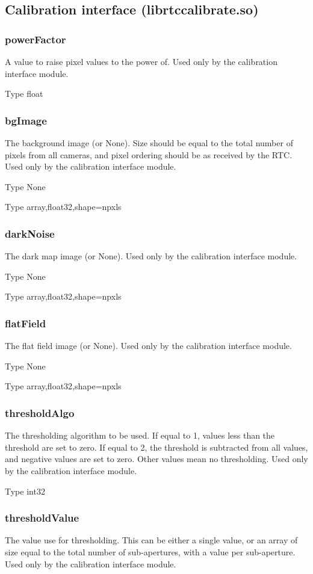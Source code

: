 \documentclass[a4,10pt]{article}
\begin{document}
\subsection{Calibration interface (librtccalibrate.so)}
\subsubsection{powerFactor}
A value to raise pixel values to the power of.  Used only by the
calibration interface module.  

Type float

\subsubsection{bgImage}
The background image (or None).  Size should be equal to the total
number of pixels from all cameras, and pixel ordering should be as
received by the RTC.  Used only by the calibration interface module.

Type None

Type array,float32,shape=npxls

\subsubsection{darkNoise}
The dark map image (or None).  Used only by the calibration interface module.

Type None

Type array,float32,shape=npxls

\subsubsection{flatField}
The flat field image (or None).  Used only by the calibration interface module.

Type None

Type array,float32,shape=npxls

\subsubsection{thresholdAlgo}
The thresholding algorithm to be used.  If equal to 1, 
values less than the threshold are set to zero.  If equal to 2, the
threshold is subtracted from all values, and negative values are set
to zero.  Other values mean no thresholding.  Used only by the calibration interface module.

Type int32

\subsubsection{thresholdValue}
The value use for thresholding.  This can be either a single value, or
an array of size equal to the total number of sub-apertures, with a
value per sub-aperture.  Used only by the calibration interface
module.
\end{document}
